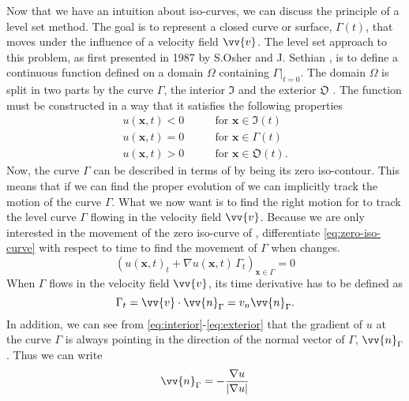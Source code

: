 Now that we have an intuition about iso-curves, we can discuss the principle
of a level set method. The goal is to represent a closed curve or surface, 
$\Gamma(t)$, that moves under the influence of a velocity field $\vv{v}$.
The level set approach to this problem, as first presented in 1987 by 
S.Osher and J. Sethian \cite{MR965860}, is to define a continuous function
\uxt defined on a domain $\Omega$ containing $\Gamma|_{t=0}$.
The domain $\Omega$ is split in two parts by the curve $\Gamma$, the interior
$\mathfrak{I}$ and the exterior $\mathfrak{O}$ . The function \uxt
must be constructed in a way that it satisfies the following properties
\begin{align}
    u(\mathbf{x}, t) < 0 \qquad &\text{for } \mathbf{x} \in  \mathfrak{I}(t) \label{eq:interior}\\
    u(\mathbf{x}, t) = 0 \qquad &\text{for } \mathbf{x} \in  \Gamma(t) \label{eq:zero-iso-curve}\\
    u(\mathbf{x}, t) > 0 \qquad &\text{for } \mathbf{x} \in  \mathfrak{O}(t) \label{eq:exterior}.
\end{align}
Now, the curve $\Gamma$ can be described in terms of \uxt by being its 
zero iso-contour. This means that if we can find the proper evolution of 
\uxt we can implicitly track the motion of the curve $\Gamma$.
What we now want is to find the right motion for \uxt to
track the level curve $\Gamma$ flowing in the velocity field $\vv{v}$. Because
we are only interested in the movement of the zero iso-curve of \uxt,
differentiate \eqref{eq:zero-iso-curve} with respect to time to find the movement
of $\Gamma$ when \uxt changes.
\begin{equation}
    (u(\mathbf{x}, t)_t + \nabla u(\mathbf{x}, t) \, \Gamma_t)_{\mathbf{x}\in \Gamma} = 0
    \label{eq:general-u-flow}
\end{equation}
When $\Gamma$ flows in the velocity field $\vv{v}$, its time derivative has to be 
defined as
\begin{equation}
    \Gamma_t = \vv{v}\cdot \vv{n}_{\Gamma} = v_n \vv{n}_{\Gamma}.
\end{equation}
In addition, we can see from \eqref{eq:interior}-\eqref{eq:exterior} that the gradient 
of $u$ at the curve $\Gamma$ is always pointing in the direction of the normal vector of 
$\Gamma$, $\vv{n}_{\Gamma}$. Thus we can write 
\begin{equation}
    \vv{n}_{\Gamma} = -\frac{\nabla u}{|\nabla u|}
\end{equation}

